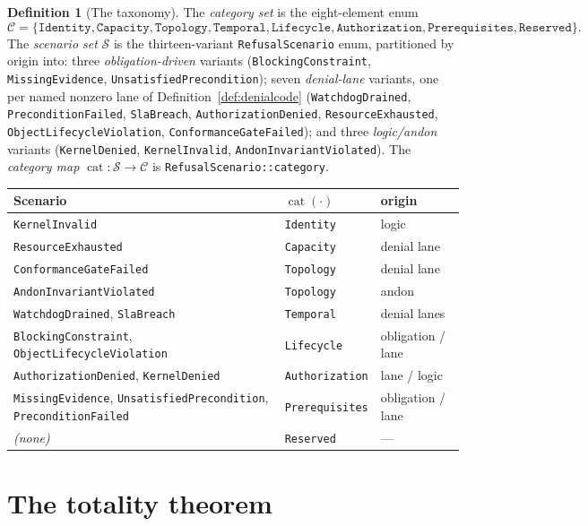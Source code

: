 \documentclass[11pt,oneside]{book}
\theoremstyle{definition}
\newtheorem{definition}{Definition}[chapter]
\theoremstyle{plain}
\theoremstyle{remark}
\newcommand{\code}[1]{\texttt{#1}}
\newcommand{\Catset}{\mathcal{C}}              %
\newcommand{\Scnset}{\mathcal{S}}              %
\DeclareMathOperator{\catop}{cat}
\begin{document}
\begin{definition}[The taxonomy]\label{def:tax}
The \emph{category set} is the eight-element enum
\[
\Catset=\{\code{Identity},\code{Capacity},\code{Topology},\code{Temporal},
\code{Lifecycle},\code{Authorization},\code{Prerequisites},\code{Reserved}\}.
\]
The \emph{scenario set} $\Scnset$ is the thirteen-variant \code{RefusalScenario} enum,
partitioned by origin into: three \emph{obligation-driven} variants
(\code{BlockingConstraint}, \code{MissingEvidence}, \code{UnsatisfiedPrecondition}); seven
\emph{denial-lane} variants, one per named nonzero lane of Definition~\ref{def:denialcode}
(\code{WatchdogDrained}, \code{PreconditionFailed}, \code{SlaBreach}, \code{AuthorizationDenied},
\code{ResourceExhausted}, \code{ObjectLifecycleViolation}, \code{ConformanceGateFailed}); and
three \emph{logic/andon} variants (\code{KernelDenied}, \code{KernelInvalid},
\code{AndonInvariantViolated}). The \emph{category map} $\catop:\Scnset\to\Catset$ is
\code{RefusalScenario::category}.
\end{definition}

\begin{center}
\small
\begin{tabular}{lll}
\toprule
Scenario & $\catop(\cdot)$ & origin\\
\midrule
\code{KernelInvalid} & \code{Identity} & logic\\
\code{ResourceExhausted} & \code{Capacity} & denial lane\\
\code{ConformanceGateFailed} & \code{Topology} & denial lane\\
\code{AndonInvariantViolated} & \code{Topology} & andon\\
\code{WatchdogDrained}, \code{SlaBreach} & \code{Temporal} & denial lanes\\
\code{BlockingConstraint}, \code{ObjectLifecycleViolation} & \code{Lifecycle} & obligation / lane\\
\code{AuthorizationDenied}, \code{KernelDenied} & \code{Authorization} & lane / logic\\
\code{MissingEvidence}, \code{UnsatisfiedPrecondition}, \code{PreconditionFailed} & \code{Prerequisites} & obligation / lane\\
\midrule
\emph{(none)} & \code{Reserved} & ---\\
\bottomrule
\end{tabular}
\end{center}

\section{The totality theorem}
\end{document}
